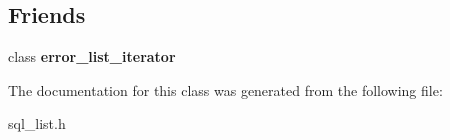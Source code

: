 \subsection*{Friends}
\begin{DoxyCompactItemize}
\item 
\mbox{\label{classbase__list__iterator_a7251d6207a206c654ca359fde3dd4060}} 
class {\bfseries error\+\_\+list\+\_\+iterator}
\end{DoxyCompactItemize}


The documentation for this class was generated from the following file\+:\begin{DoxyCompactItemize}
\item 
sql\+\_\+list.\+h\end{DoxyCompactItemize}
